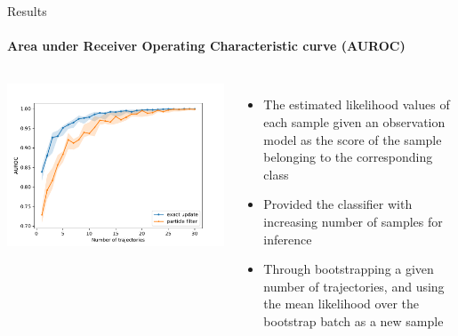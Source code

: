 \documentclass[
	english,%
	aspectratio=169,%
	color={accentcolor=3b},
	logo=true,%
	colorframetitle=false,%
	]{tudabeamer}
\begin{document}
\begin{frame}{Results}
\framesubtitle{Area under Receiver Operating Characteristic curve (AUROC)}
\begin{columns}[onlytextwidth,c]
\centering
\includegraphics[width=\linewidth]{figures/AUROC_perc_0}
\begin{itemize}
	\item The estimated likelihood values of each sample given an observation model as the score of the sample belonging to the corresponding class
	\item Provided the classifier with increasing number of samples for inference
	\item Through bootstrapping a given number of trajectories, and using the mean likelihood over the bootstrap batch as a new sample
\end{itemize}
\end{columns}
\end{frame}
\end{document}
